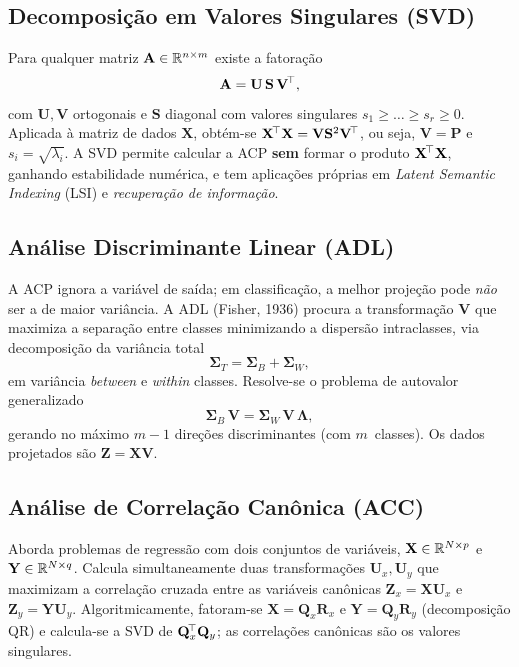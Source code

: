 \subsection{Decomposição em Valores Singulares (SVD)}

Para qualquer matriz $\mathbf{A}\in\mathbb{R}^{n\times m}$ existe a fatoração
\[
\mathbf{A}=\mathbf{U}\,\mathbf{S}\,\mathbf{V}^{\!\top},
\]
com $\mathbf{U},\mathbf{V}$ ortogonais e $\mathbf{S}$ diagonal com
valores singulares $s_1\geq\dots\geq s_r\geq 0$. Aplicada à matriz de
dados $\mathbf{X}$, obtém-se $\mathbf{X}^{\!\top}\mathbf{X}=\mathbf{V}
\mathbf{S}^2\mathbf{V}^{\!\top}$, ou seja, $\mathbf{V}=\mathbf{P}$ e
$s_i=\sqrt{\lambda_i}$. A SVD permite calcular a ACP \textbf{sem} formar
o produto $\mathbf{X}^{\!\top}\mathbf{X}$, ganhando estabilidade numérica, e
tem aplicações próprias em \emph{Latent Semantic Indexing} (LSI) e
\emph{recuperação de informação}.

\subsection{Análise Discriminante Linear (ADL)}

A ACP ignora a variável de saída; em classificação, a melhor
projeção pode \emph{não} ser a de maior variância. A ADL (Fisher,
1936) procura a transformação $\mathbf{V}$ que maximiza a separação
entre classes minimizando a dispersão intraclasses, via decomposição
da variância total
\[
\boldsymbol\Sigma_T = \boldsymbol\Sigma_B + \boldsymbol\Sigma_W,
\]
em variância \emph{between} e \emph{within} classes. Resolve-se o
problema de autovalor generalizado
\[
\boldsymbol\Sigma_B\,\mathbf{V} = \boldsymbol\Sigma_W\,\mathbf{V}\,
\boldsymbol\Lambda,
\]
gerando no máximo $m-1$ direções discriminantes (com $m$~classes). Os
dados projetados são $\mathbf{Z}=\mathbf{X}\mathbf{V}$.

\subsection{Análise de Correlação Canônica (ACC)}

Aborda problemas de regressão com dois conjuntos de variáveis,
$\mathbf{X}\in\mathbb{R}^{N\times p}$ e $\mathbf{Y}\in\mathbb{R}^{N\times q}$.
Calcula simultaneamente duas transformações $\mathbf{U}_x,\mathbf{U}_y$
que maximizam a correlação cruzada entre as variáveis canônicas
$\mathbf{Z}_x=\mathbf{X}\mathbf{U}_x$ e
$\mathbf{Z}_y=\mathbf{Y}\mathbf{U}_y$. Algoritmicamente, fatoram-se
$\mathbf{X}=\mathbf{Q}_x\mathbf{R}_x$ e
$\mathbf{Y}=\mathbf{Q}_y\mathbf{R}_y$ (decomposição QR) e calcula-se a
SVD de $\mathbf{Q}_x^{\!\top}\mathbf{Q}_y$; as correlações canônicas são os
valores singulares.

